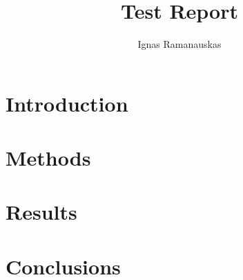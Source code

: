 \documentclass{article}
\author{Ignas Ramanauskas}
\title{Test Report}
\begin{document}
\maketitle

\section{Introduction}


\section{Methods}


\section{Results}


\section{Conclusions}

\end{document}

